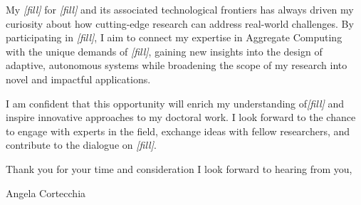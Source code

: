 \documentclass[12pt,a4paper]{letter} %
\newcommand{\Who}{Angela Cortecchia} %
\begin{document}
My \textit{[fill]} for \textit{[fill]} and its associated technological frontiers has always driven my curiosity about 
how cutting-edge research can address real-world challenges. 
%
By participating in \textit{[fill]}, 
I aim to connect my expertise in Aggregate Computing with the unique demands of \textit{[fill]}, 
gaining new insights into the design of adaptive, 
autonomous systems while broadening the scope of my research into novel and impactful applications.

I am confident that this opportunity will enrich my understanding of\textit{[fill]} 
and inspire innovative approaches to my doctoral work. 
%
I look forward to the chance to engage with experts in the field, 
exchange ideas with fellow researchers, 
and contribute to the dialogue on \textit{[fill]}. 


Thank you for your time and consideration
I look forward to hearing from you,


\vspace{0.1\textwidth}

\hfill{}\Who





\end{document}
